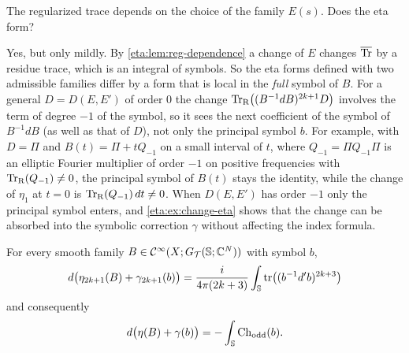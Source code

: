 \begin{question}
  The regularized trace depends on the choice of the family $E(s)$. Does the eta
  form?
\end{question}
\begin{answer}
  Yes, but only mildly. By \cref{eta:lem:reg-dependence} a change of $E$ changes
  $\overline{\operatorname{Tr}}$ by a residue trace, which is an integral of symbols. So the eta forms
  defined with two admissible families differ by a form that is local in the
  \emph{full} symbol of $B$. For a general $D=D(E,E')$ of order $0$ the change
  $\operatorname{Tr}_{\mathrm{R}}\bigl((B^{-1}dB)^{2k+1}D\bigr)$ involves the term of degree $-1$ of the
  symbol, so it sees the next coefficient of the symbol of $B^{-1}dB$ (as well as that
  of $D$), not only the principal symbol $b$. For example, with $D=\Pi$ and
  $B(t)=\Pi+tQ_{-1}$ on a small interval of $t$, where $Q_{-1}=\Pi Q_{-1}\Pi$ is an
  elliptic Fourier multiplier of order $-1$ on positive frequencies with
  $\operatorname{Tr}_{\mathrm{R}}(Q_{-1})\ne0$, the principal symbol of $B(t)$ stays the identity, while the
  change of $\eta_1$ at $t=0$ is $\operatorname{Tr}_{\mathrm{R}}(Q_{-1})\,dt\ne0$. When $D(E,E')$ has order $-1$
  only the principal symbol enters, and \cref{eta:ex:change-eta} shows that the
  change can be absorbed into the symbolic correction $\gamma$ without affecting the
  index formula.
\end{answer}

\begin{theorem}\label{eta:thm:variation}
For every smooth family $B\in\mathcal{C}^\infty(X;G_{\mathcal{T}}(\mathbb{S};\mathbb{C}^N))$ with symbol $b$,
\begin{equation}\label{eta:eq:variation}
d\bigl(\eta_{2k+1}(B)+\gamma_{2k+1}(b)\bigr)=\frac{i}{4\pi(2k+3)}\int_{\mathbb{S}}
\operatorname{tr}\bigl((b^{-1}d'b)^{2k+3}\bigr)
\end{equation}
and consequently
\begin{equation}\label{eta:eq:variation-total}
d\bigl(\eta(B)+\gamma(b)\bigr)=-\int_{\mathbb{S}}\operatorname{Ch}_{\mathrm{odd}}(b).
\end{equation}
\end{theorem}

